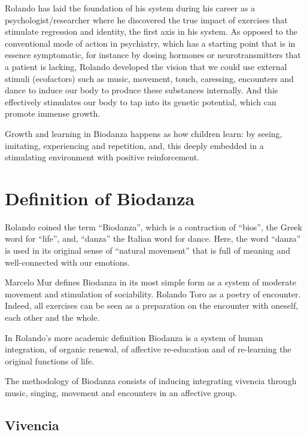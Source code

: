 \documentclass[
  11pt,
]{book}
\begin{document}
Rolando has laid the foundation of his system during his career as a psychologist/researcher where he discovered the true impact of exercises that stimulate regression and identity, the first axis in his system. As opposed to the conventional mode of action in psychiatry, which has a starting point that is in essence symptomatic, for instance by dosing hormones or neurotransmitters that a patient is lacking, Rolando developed the vision that we could use external stimuli (ecofactors) such as music, movement, touch, caressing, encounters and dance to induce our body to produce these substances internally. And this effectively stimulates our body to tap into its genetic potential, which can promote immense growth.

Growth and learning in Biodanza happens as how children learn: by seeing, imitating, experiencing and repetition, and, this deeply embedded in a stimulating environment with positive reinforcement.

\hypertarget{definition-of-biodanza}{%
\section{Definition of Biodanza}\label{definition-of-biodanza}}

Rolando coined the term ``Biodanza'', which is a contraction of ``bios'', the Greek word for ``life'', and, ``danza'' the Italian word for dance. Here, the word ``danza'' is used in its original sense of ``natural movement'' that is full of meaning and well-connected with our emotions.

Marcelo Mur defines Biodanza in its most simple form as a system of moderate movement and stimulation of sociability.
Rolando Toro as a poetry of encounter. Indeed, all exercises can be seen as a preparation on the encounter with oneself, each other and the whole.

In Rolando's more academic definition Biodanza is a system of human integration, of organic renewal, of affective re-education and of re-learning the original functions of life.

The methodology of Biodanza consists of inducing integrating vivencia through music, singing, movement and encounters in an affective group.

\hypertarget{vivencia}{%
\subsection{Vivencia}\label{vivencia}}
\end{document}

